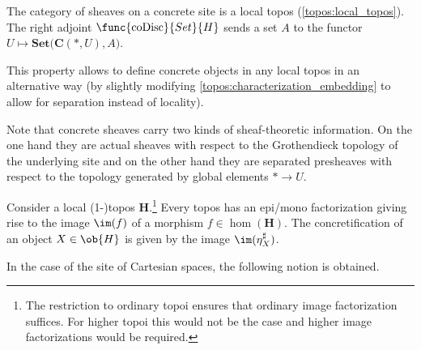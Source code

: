     \begin{property}
        The category of sheaves on a concrete site is a local topos (\cref{topos:local_topos}). The right adjoint $\func{\mathrm{coDisc}}{Set}{H}$ sends a set $A$ to the functor $U\mapsto\mathbf{Set}\bigl(\mathbf{C}(\ast,U),A\bigr)$.
    \end{property}
    This property allows to define concrete objects in any local topos in an alternative way (by slightly modifying \cref{topos:characterization_embedding} to allow for separation instead of locality).
    \begin{remark}
        Note that concrete sheaves carry two kinds of sheaf-theoretic information. On the one hand they are actual sheaves with respect to the Grothendieck topology of the underlying site and on the other hand they are separated presheaves with respect to the topology generated by global elements $\ast\rightarrow U$.
    \end{remark}

    \begin{property}[Concretification]\label{topos:concretification}
        Consider a local (1-)topos $\mathbf{H}$.\footnote{The restriction to ordinary topoi ensures that ordinary image factorization suffices. For higher topoi this would not be the case and higher image factorizations would be required.} Every topos has an epi/mono factorization giving rise to the image $\im(f)$ of a morphism $f\in\hom(\mathbf{H})$. The concretification of an object $X\in\ob{H}$ is given by the image $\im(\eta^\sharp_X)$. 
    \end{property}

    In the case of the site of Cartesian spaces, the following notion is obtained.

